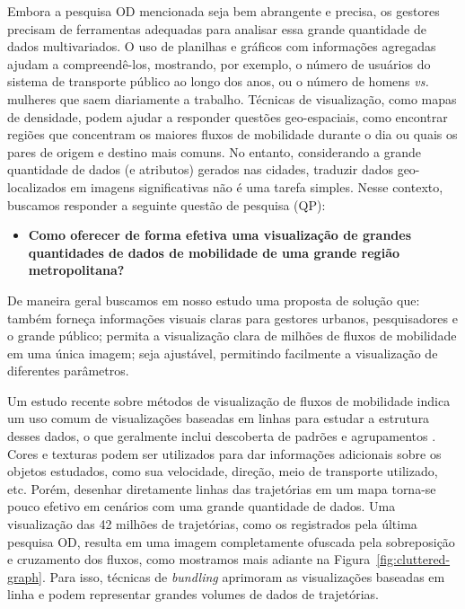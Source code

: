 Embora a pesquisa OD mencionada seja bem abrangente e precisa, 
os gestores precisam de ferramentas adequadas para analisar essa grande quantidade de
dados multivariados. O uso de planilhas e gráficos com informações agregadas
ajudam a compreendê-los, mostrando, por exemplo, o número de usuários 
do sistema de transporte público ao longo dos anos, ou o número de homens \emph{vs.} mulheres
que saem diariamente a trabalho. Técnicas de visualização, como mapas de densidade,
podem ajudar a responder questões geo-espaciais, como encontrar regiões que concentram
os maiores fluxos de mobilidade durante o dia ou quais os pares de origem e destino
mais comuns. No entanto, considerando a grande quantidade de dados (e atributos) gerados
nas cidades, traduzir dados geo-localizados em imagens significativas não é uma tarefa simples.
Nesse contexto, buscamos responder a seguinte questão de pesquisa (QP):

\begin{itemize}
  \item \textbf{Como oferecer de forma efetiva uma visualização de grandes quantidades de
dados de mobilidade de uma grande região metropolitana?}
\end{itemize}

De maneira geral buscamos em nosso estudo uma proposta de solução que: também
forneça informações visuais claras para gestores urbanos, pesquisadores e o
grande público; permita a visualização clara de milhões de fluxos de mobilidade
em uma única imagem; seja ajustável, permitindo facilmente a visualização de
diferentes parâmetros.

Um estudo recente sobre métodos de visualização de fluxos de mobilidade indica
um uso comum de visualizações baseadas em linhas para estudar a estrutura desses
dados, o que geralmente inclui descoberta de padrões e agrupamentos
\citep{Chen2015}. Cores e texturas podem ser utilizados para dar informações
adicionais sobre os objetos estudados, como sua velocidade, direção, meio de
transporte utilizado, etc. Porém, desenhar diretamente linhas das trajetórias em
um mapa torna-se pouco efetivo em cenários com uma grande quantidade de dados.
Uma visualização das 42 milhões de trajetórias, como os registrados pela última
pesquisa OD, resulta em uma imagem completamente ofuscada pela sobreposição e
cruzamento dos fluxos, como mostramos mais adiante na
Figura~\ref{fig:cluttered-graph}. Para isso, técnicas de \emph{bundling}
aprimoram as visualizações baseadas em linha e podem representar grandes volumes
de dados de trajetórias.

